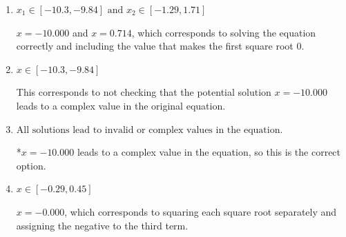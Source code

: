 \documentclass{extbook}[14pt]
\begin{document}
\begin{enumerate}
{\begin{enumerate}[label=\Alph*.]
$x = -0.625$ and $x = 0.714$, which corresponds to solving each radical separately for 0.
\item \( x_1 \in [-10.3, -9.84] \text{ and } x_2 \in [-1.29,1.71] \)

$x = -10.000$ and $x = 0.714$, which corresponds to solving the equation correctly and including the value that makes the first square root 0.
\item \( x \in [-10.3,-9.84] \)

This corresponds to not checking that the potential solution $x = -10.000$ leads to a complex value in the original equation.
\item \( \text{All solutions lead to invalid or complex values in the equation.} \)

*$x = -10.000$ leads to a complex value in the equation, so this is the correct option.
\item \( x \in [-0.29,0.45] \)

$x = -0.000$, which corresponds to squaring each square root separately and assigning the negative to the third term.
\end{enumerate}

}
\end{enumerate}
\end{document}
